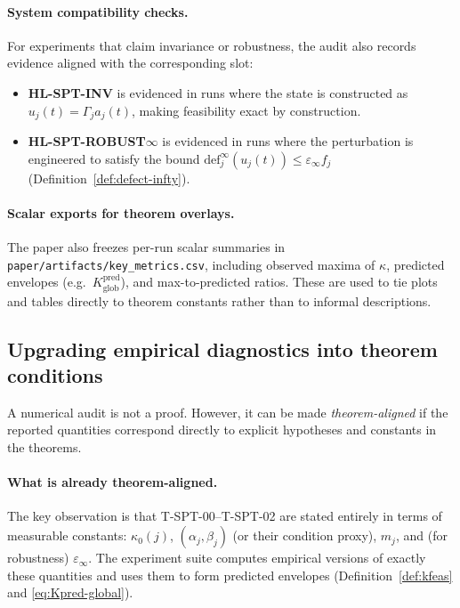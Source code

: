 \documentclass[11pt]{article}
\begin{document}
\paragraph{System compatibility checks.}
For experiments that claim invariance or robustness, the audit also records evidence aligned with the corresponding slot:
\begin{itemize}
\item \textbf{HL-SPT-INV} is evidenced in runs where the state is constructed as $u_j(t)=\Gamma_j a_j(t)$, making feasibility exact by construction.
\item \textbf{HL-SPT-ROBUST$\infty$} is evidenced in runs where the perturbation is engineered to satisfy the bound
$\mathrm{def}^\infty_j(u_j(t))\le \varepsilon_\infty f_j$
(Definition~\ref{def:defect-infty}).
\end{itemize}

\paragraph{Scalar exports for theorem overlays.}
The paper also freezes per-run scalar summaries in \texttt{paper/artifacts/key\_metrics.csv}, including observed maxima of $\kappa$, predicted envelopes (e.g.\ $K^{\mathrm{pred}}_{\mathrm{glob}}$), and max-to-predicted ratios.
These are used to tie plots and tables directly to theorem constants rather than to informal descriptions.

\subsection{Upgrading empirical diagnostics into theorem conditions}

A numerical audit is not a proof.
However, it can be made \emph{theorem-aligned} if the reported quantities correspond directly to explicit hypotheses and constants in the theorems.

\paragraph{What is already theorem-aligned.}
The key observation is that T-SPT-00--T-SPT-02 are stated entirely in terms of measurable constants:
$\kappa_0(j)$, $(\alpha_j,\beta_j)$ (or their condition proxy), $m_j$, and (for robustness) $\varepsilon_\infty$.
The experiment suite computes empirical versions of exactly these quantities and uses them to form predicted envelopes (Definition~\ref{def:kfeas} and \eqref{eq:Kpred-global}).
\end{document}
